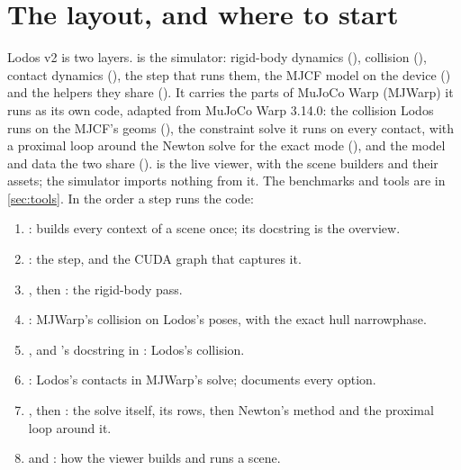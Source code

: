 



\section{The layout, and where to start}\label{sec:layout}

Lodos v2 is two layers.  is the simulator: rigid-body dynamics (), collision (), contact dynamics (), the step that runs them, the MJCF model on the device () and the helpers they share (). It carries the parts of MuJoCo Warp (MJWarp) it runs as its own code, adapted from MuJoCo Warp 3.14.0: the collision Lodos runs on the MJCF's geoms (), the constraint solve it runs on every contact, with a proximal loop around the Newton solve for the exact mode (), and the model and data the two share ().  is the live viewer, with the scene builders and their assets; the simulator imports nothing from it. The benchmarks and tools are in \cref{sec:tools}. In the order a step runs the code:

\begin{enumerate}[nosep]
\item {}:  builds every context of a scene once; its docstring is the overview.
\item {}: the step, and the CUDA graph that captures it.
\item {}, then : the rigid-body pass.
\item {}: MJWarp's collision on Lodos's poses, with the exact hull narrowphase.
\item {}, and 's docstring in : Lodos's collision.
\item {}: Lodos's contacts in MJWarp's solve;  documents every option.
\item {}, then : the solve itself, its rows, then Newton's method and the proximal loop around it.
\item {} and : how the viewer builds and runs a scene.
\end{enumerate}

